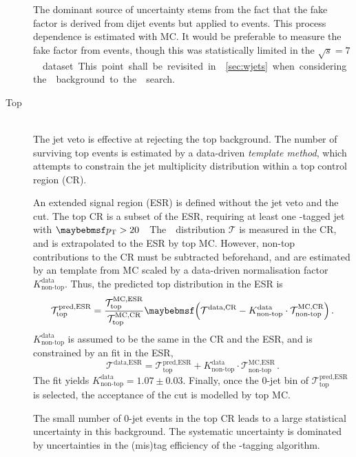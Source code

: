 \begin{description}
	The dominant source of uncertainty stems from the fact that the fake factor is 
	derived from dijet events but applied to \Wjets events. This process dependence is 
	estimated with MC. It would be preferable to measure the fake factor from \Zjets 
	events, though this was statistically limited in the \unit{$\sqrt{s} = 7$}{\TeV} 
	dataset. This point shall be revisited in \Section~\ref{sec:wjets} when considering 
	the \Wjets background to the \HWW search.

\item[Top] \hfill \\
	The jet veto is effective at rejecting the top background. The number of surviving 
	top events is estimated by a data-driven \textit{template method}, which attempts to 
	constrain the jet multiplicity distribution within a top control region (CR).

	An extended signal region (ESR) is defined without the jet veto and the \ptll cut. The 
	top CR is a subset of the ESR, requiring at least one \Pbottom-tagged jet with 
	\unit{$\pt > 20$}{\GeV}. The \njets distribution $\mathcal{T}$ is measured in the CR, 
	and is extrapolated to the ESR by top MC. However, non-top contributions to the CR 
	must be subtracted beforehand, and are estimated by an \njets template from MC 
	scaled by a data-driven normalisation factor $K_{\text{non-top}}^{\text{data}}$. 
	Thus, the predicted top \njets distribution in the ESR is
	\begin{equation}
		\mathcal{T}_{\text{top}}^{\text{pred,ESR}} = \frac{\mathcal{T}_{\text{top}}^{\text{MC,ESR}}}{\mathcal{T}_{\text{top}}^{\text{MC,CR}}} \parenths{\mathcal{T}^{\text{data,CR}} - K_{\text{non-top}}^{\text{data}} \cdot \mathcal{T}_{\text{non-top}}^{\text{MC,CR}}} \,.
	\end{equation}
	$K_{\text{non-top}}^{\text{data}}$ is assumed to be the same in the CR and the ESR, 
	and is constrained by an \njets fit in the ESR, \ie
	\begin{equation}
		\mathcal{T}^{\text{data,ESR}} = \mathcal{T}_{\text{top}}^{\text{pred,ESR}} + K_{\text{non-top}}^{\text{data}} \cdot \mathcal{T}_{\text{non-top}}^{\text{MC,ESR}} \,.
	\end{equation}
	The fit yields $K_{\text{non-top}}^{\text{data}} = 1.07 \pm 0.03$.
	Finally, once the 0-jet bin of $\mathcal{T}_{\text{top}}^{\text{pred,ESR}}$ is 
	selected, the acceptance of the \ptll cut is modelled by top MC.

	The small number of 0-jet events in the top CR leads to a large statistical 
	uncertainty in this background. The systematic uncertainty is dominated by 
	uncertainties in the (mis)tag efficiency of the \Pbottom-tagging algorithm.


\end{description}
